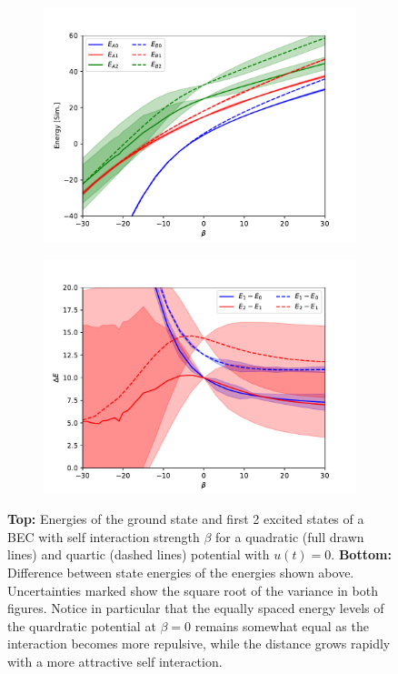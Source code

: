 \documentclass[a4paper, twocolumn]{revtex4-1}
\begin{document}
\begin{figure}
	\begin{subfigure}{\columnwidth}
		\includegraphics[width=\columnwidth]{graphics/stateAnalysis/Energylevels.pdf}
	\end{subfigure}
	\begin{subfigure}{\columnwidth}
		\includegraphics[width=\columnwidth]{graphics/stateAnalysis/EnergyDifference.pdf}
	\end{subfigure}
	\caption{\textbf{Top:} Energies of the ground state and first 2 excited states of a BEC with self interaction strength $\beta$ for a quadratic (full drawn lines) and quartic (dashed lines) potential with $u(t) = 0$. \textbf{Bottom:} Difference between state energies of the energies shown above. Uncertainties marked show the square root of the variance in both figures. Notice in particular that the equally spaced energy levels of the quardratic potential at $\beta=0$ remains somewhat equal as the interaction becomes more repulsive, while the distance grows rapidly with a more attractive self interaction.}
	\label{fig:energyLevels}
\end{figure}
\end{document}
